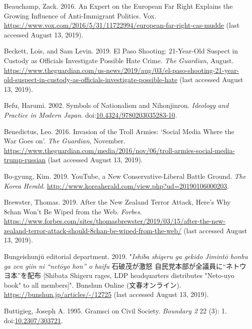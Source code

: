 \documentclass[10pt,british,A4paper,oneside]{memoir}
\begin{document}
\hypertarget{ref-beauchamp_expert_2016}{}
Beauchamp, Zack. 2016. An Expert on the European Far Right Explains the
Growing Influence of Anti-Immigrant Politics. Vox.
\url{https://www.vox.com/2016/5/31/11722994/european-far-right-cas-mudde} (last accessed August 13, 2019).

\hypertarget{ref-beckett_paso_2019}{}
Beckett, Lois, and Sam Levin. 2019. El Paso Shooting: 21-Year-Old
Suspect in Custody as Officials Investigate Possible Hate Crime.
\emph{The Guardian}, August.
\url{https://www.theguardian.com/us-news/2019/aug/03/el-paso-shooting-21-year-old-suspect-in-custody-as-officials-investigate-possible-hate} (last accessed August 13, 2019).

\hypertarget{ref-befu_symbols_2002}{}
Befu, Harumi. 2002. Symbols of Nationalism and Nihonjinron.
\emph{Ideology and Practice in Modern Japan}.
doi:\href{https://doi.org/10.4324/9780203035283-10}{10.4324/9780203035283-10}.

\hypertarget{ref-benedictus_invasion_2016}{}
Benedictus, Leo. 2016. Invasion of the Troll Armies: `Social Media Where
the War Goes on'. \emph{The Guardian}, November.
\url{https://www.theguardian.com/media/2016/nov/06/troll-armies-social-media-trump-russian} (last accessed August 13, 2019).

\hypertarget{ref-bo-gyung_youtube_2019}{}
Bo-gyung, Kim. 2019. YouTube, a New Conservative-Liberal Battle Ground.
\emph{The Korea Herald}.
\url{http://www.koreaherald.com/view.php?ud=20190106000203}.

\hypertarget{ref-brewster_after_2019}{}
Brewster, Thomas. 2019. After the New Zealand Terror Attack, Here's Why
8chan Won't Be Wiped from the Web. \emph{Forbes}.
\url{https://www.forbes.com/sites/thomasbrewster/2019/03/15/after-the-new-zealand-terror-attack-should-8chan-be-wiped-from-the-web/} (last accessed August 13, 2019).

\hypertarget{ref-bungeishunju_editorial_department_eng._2019}{}
Bungeishunjū editorial department. 2019. "\emph{Ishiba shigeru ga gekido Jimintō honbu ga zen giin ni “netōyo hon” o haifu} 石破茂が激怒 自民党本部が全議員に“ネトウヨ本”を配布 [Shibata Shigeru rages, LDP headquarters distributes "Neto-uyo book" to all members]". 
Bunshun Online (文春オンライン). \url{https://bunshun.jp/articles/-/12725} (last accessed August 13, 2019).

\hypertarget{ref-buttigieg_gramsci_1995}{}
Buttigieg, Joseph A. 1995. Gramsci on Civil Society. \emph{Boundary 2}
22 (3): 1. doi:\href{https://doi.org/10.2307/303721}{10.2307/303721}.
\end{document}
